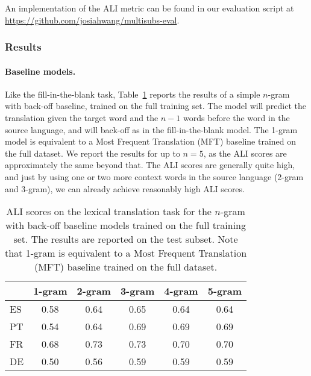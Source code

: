\documentclass[twocolumn]{svjour3}          \smartqed  \usepackage{graphicx}
\begin{document}
An implementation of the ALI metric can be found in our evaluation script at\\ \url{https://github.com/josiahwang/multisubs-eval}.

\subsubsection{Results}
\label{sec:mlt-results}

\paragraph{Baseline models. } Like the fill-in-the-blank task, Table~\ref{tbl:mlt-baseline} reports the results of a simple $n$-gram with back-off baseline, trained on the full training set. The model will predict the translation given the target word and the $n-1$ words before the word in the source language, and will back-off as in the fill-in-the-blank model. The 1-gram model is equivalent to a Most Frequent Translation (MFT) baseline trained on the full dataset. We report the results for up to $n=5$, as the ALI scores are approximately the same beyond that. The ALI scores are generally quite high, and just by using one or two more context words in the source language (2-gram and 3-gram), we can already achieve reasonably high ALI scores.

\begin{table}[t]
    \caption{ALI scores on the lexical translation task for the $n$-gram with back-off baseline models trained on the full training set. The results are reported on the test subset. Note that 1-gram is equivalent to a Most Frequent Translation (MFT) baseline trained on the full dataset.
    }
    \label{tbl:mlt-baseline}
    \centering
    \begin{tabular}{l c c c c c}
        \toprule
        & 1-gram & 2-gram & 3-gram & 4-gram & 5-gram\\
        \midrule
        ES & 0.58 & 0.64 & 0.65 & 0.64 & 0.64\\
        PT & 0.54 & 0.64 & 0.69 & 0.69 & 0.69\\
        FR & 0.68 & 0.73 & 0.73 & 0.70 & 0.70\\
        DE & 0.50 & 0.56 & 0.59 & 0.59 & 0.59\\ 
        \bottomrule
    \end{tabular}
\end{table}
\end{document}
